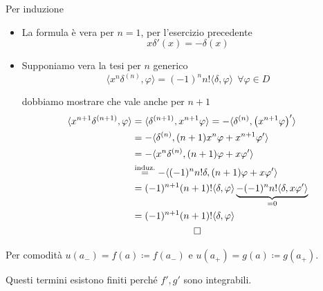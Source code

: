 Per induzione
\begin{itemize}
\item La formula è vera per $n = 1$, per l'esercizio precedente
\begin{equation*}
x\delta '(x) = - \delta (x)
\end{equation*}
\item Supponiamo vera la tesi per $n$ generico
\begin{equation*}
\langle x^{n} \delta^{(n)}, \varphi \rangle = (- 1)^{n} n!\langle \delta, \varphi \rangle \ \ \forall \varphi \in D
\end{equation*}

dobbiamo mostrare che vale anche per $n + 1$
\begin{gather*}
\begin{aligned}
\langle x^{n + 1} \delta^{(n + 1)}, \varphi \rangle  & = \langle \delta^{(n + 1)}, x^{n + 1} \varphi \rangle = - \langle \delta^{(n)}, \left(x^{n + 1} \varphi \right) '\rangle \\
 & = - \langle \delta^{(n)}, (n + 1) x^{n} \varphi + x^{n + 1} \varphi '\rangle \\
 & = - \langle x^{n} \delta^{(n)}, (n + 1) \varphi + x\varphi '\rangle \\
 & \overset{\text{induz.}}{=} - \langle (- 1)^{n} n!\delta, (n + 1) \varphi + x\varphi '\rangle \\
 & = (- 1)^{n + 1}(n + 1) !\langle \delta, \varphi \rangle \underbrace{- (- 1)^{n} n!\langle \delta, x\varphi '\rangle}_{= 0}\\
 & = (- 1)^{n + 1}(n + 1) !\langle \delta, \varphi \rangle 
\end{aligned}\\
\qed 
\end{gather*}
\end{itemize}
\Soluzione

Per comodità $u(a_{-}) = f(a) \coloneqq f(a_{-})$ e $u(a_{+}) = g(a) \coloneqq g(a_{+})$.

Questi termini esistono finiti perché $f', g'$ sono integrabili.

